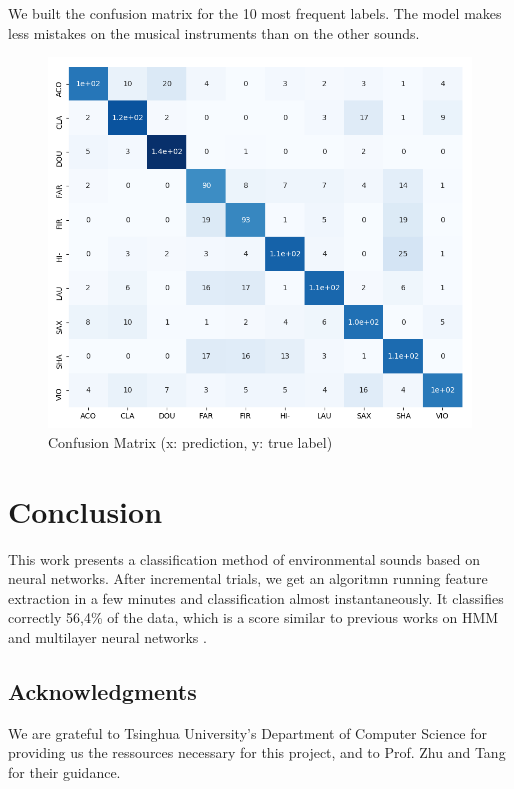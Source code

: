 \documentclass[final]{beamer}
\begin{document}
\begin{frame}[t]
\begin{multicols}{3}
        We built the confusion matrix for the 10 most frequent labels. The model makes less mistakes on the musical instruments than on the other sounds.
		\begin{figure}
		\centering
		\includegraphics[width=0.90\columnwidth]{confusion_matrix.png}
		\caption{Confusion Matrix (x: prediction, y: true label)}
		\end{figure}

\section{Conclusion}

	This work presents a classification method of environmental sounds based on neural networks. After incremental trials, we get an algoritmn running feature extraction in a few minutes and classification almost instantaneously. It classifies correctly 56,4\% of the data, which is a score similar to previous works on HMM \cite{ref1} and multilayer neural networks \cite{ref5}.


\subsection{Acknowledgments}
	We are grateful to Tsinghua University's Department of Computer Science for providing us the ressources necessary for this project,
	and to Prof. Zhu and Tang for their guidance.


\end{multicols}
\end{frame}
\end{document}
